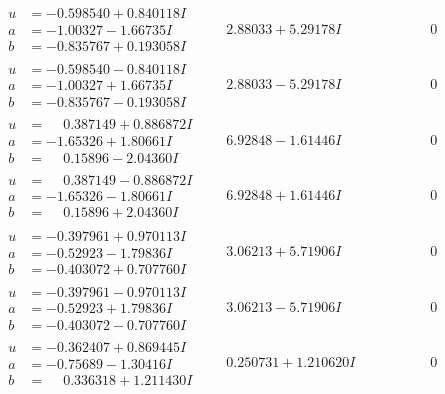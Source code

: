 \documentclass[1p]{elsarticle_modified}
\theoremstyle{definition}
\begin{document}
$$\begin{array}{c|c|c}
\begin{aligned}
u &= -0.598540 + 0.840118 I \\
a &= -1.00327 - 1.66735 I \\
b &= -0.835767 + 0.193058 I\end{aligned}
 & \phantom{-}2.88033 + 5.29178 I & \phantom{-0.000000 } 0 \\ \hline\begin{aligned}
u &= -0.598540 - 0.840118 I \\
a &= -1.00327 + 1.66735 I \\
b &= -0.835767 - 0.193058 I\end{aligned}
 & \phantom{-}2.88033 - 5.29178 I & \phantom{-0.000000 } 0 \\ \hline\begin{aligned}
u &= \phantom{-}0.387149 + 0.886872 I \\
a &= -1.65326 + 1.80661 I \\
b &= \phantom{-}0.15896 - 2.04360 I\end{aligned}
 & \phantom{-}6.92848 - 1.61446 I & \phantom{-0.000000 } 0 \\ \hline\begin{aligned}
u &= \phantom{-}0.387149 - 0.886872 I \\
a &= -1.65326 - 1.80661 I \\
b &= \phantom{-}0.15896 + 2.04360 I\end{aligned}
 & \phantom{-}6.92848 + 1.61446 I & \phantom{-0.000000 } 0 \\ \hline\begin{aligned}
u &= -0.397961 + 0.970113 I \\
a &= -0.52923 - 1.79836 I \\
b &= -0.403072 + 0.707760 I\end{aligned}
 & \phantom{-}3.06213 + 5.71906 I & \phantom{-0.000000 } 0 \\ \hline\begin{aligned}
u &= -0.397961 - 0.970113 I \\
a &= -0.52923 + 1.79836 I \\
b &= -0.403072 - 0.707760 I\end{aligned}
 & \phantom{-}3.06213 - 5.71906 I & \phantom{-0.000000 } 0 \\ \hline\begin{aligned}
u &= -0.362407 + 0.869445 I \\
a &= -0.75689 - 1.30416 I \\
b &= \phantom{-}0.336318 + 1.211430 I\end{aligned}
 & \phantom{-}0.250731 + 1.210620 I & \phantom{-0.000000 } 0 \\ \hline\begin{aligned}

\end{aligned}
\end{array}$$
\end{document}
